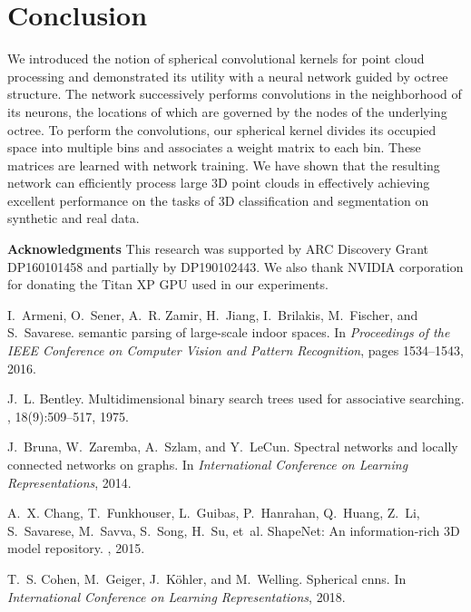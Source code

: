 \documentclass[10pt,twocolumn,letterpaper]{article}
\begin{document}
{\section{Conclusion}
We introduced the notion of spherical convolutional kernels for point cloud processing and demonstrated its utility with a neural network guided by octree structure. The network successively performs convolutions in the neighborhood of its neurons, the locations of which are governed by the nodes of the underlying octree. To perform the convolutions, our  spherical kernel divides its occupied space into multiple bins and associates a weight matrix to each bin. These matrices are learned with network training. We have shown that the resulting network can efficiently process large 3D point clouds in effectively achieving excellent performance on the tasks of 3D classification and segmentation on synthetic and real data. 

{\noindent \textbf{Acknowledgments}} This research was supported by
ARC Discovery Grant DP160101458 and partially by
DP190102443. We also thank NVIDIA corporation for donating
the Titan XP GPU used in our experiments.

\begin{thebibliography}{10}\itemsep=-1pt

I.~Armeni, O.~Sener, A.~R. Zamir, H.~Jiang, I.~Brilakis, M.~Fischer, and
  S.~Savarese.
 semantic parsing of large-scale indoor spaces.
\newblock In {\em Proceedings of the IEEE Conference on Computer Vision and
  Pattern Recognition}, pages 1534--1543, 2016.

J.~L. Bentley.
\newblock Multidimensional binary search trees used for associative searching.
, 18(9):509--517, 1975.

J.~Bruna, W.~Zaremba, A.~Szlam, and Y.~LeCun.
\newblock Spectral networks and locally connected networks on graphs.
\newblock In {\em International Conference on Learning Representations}, 2014.

A.~X. Chang, T.~Funkhouser, L.~Guibas, P.~Hanrahan, Q.~Huang, Z.~Li,
  S.~Savarese, M.~Savva, S.~Song, H.~Su, et~al.
\newblock Shape{N}et: An information-rich {3D} model repository.
, 2015.

T.~S. Cohen, M.~Geiger, J.~K{\"o}hler, and M.~Welling.
\newblock Spherical cnns.
\newblock In {\em International Conference on Learning Representations}, 2018.


\end{thebibliography}}
\end{document}
